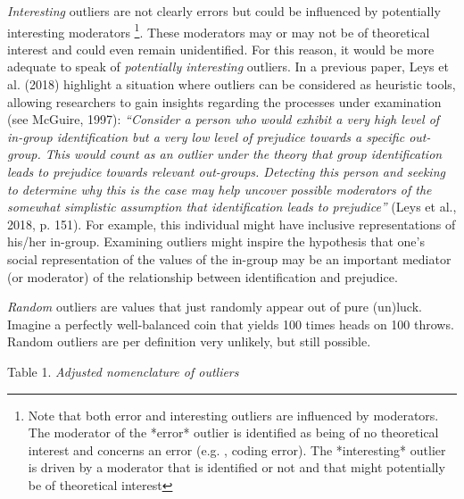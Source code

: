 \documentclass[man,floatsintext]{apa6}
\let\rmarkdownfootnote\footnote%
\def\footnote{\protect\rmarkdownfootnote}
\begin{document}
\emph{Interesting} outliers are not clearly errors but could be influenced by potentially interesting moderators \footnote{Note that both error and interesting outliers are influenced by moderators. The moderator of the *error* outlier is identified as being of no theoretical interest and concerns an error (e.g. , coding error). The *interesting* outlier is driven by a moderator that is identified or not and that might potentially be of theoretical interest}. These moderators may or may not be of theoretical interest and could even remain unidentified. For this reason, it would be more adequate to speak of \emph{potentially interesting} outliers. In a previous paper, Leys et al. (2018) highlight a situation where outliers can be considered as heuristic tools, allowing researchers to gain insights regarding the processes under examination (see McGuire, 1997): \emph{\enquote{Consider a person who would exhibit a very high level of in-group identification but a very low level of prejudice towards a specific out-group. This would count as an outlier under the theory that group identification leads to prejudice towards relevant out-groups. Detecting this person and seeking to determine why this is the case may help uncover possible moderators of the somewhat simplistic assumption that identification leads to prejudice}} (Leys et al., 2018, p. 151). For example, this individual might have inclusive representations of his/her in-group. Examining outliers might inspire the hypothesis that one's social representation of the values of the in-group may be an important mediator (or moderator) of the relationship between identification and prejudice.

\emph{Random} outliers are values that just randomly appear out of pure (un)luck. Imagine a perfectly well-balanced coin that yields 100 times heads on 100 throws. Random outliers are per definition very unlikely, but still possible.

Table 1.
\emph{Adjusted nomenclature of outliers}
\end{document}
